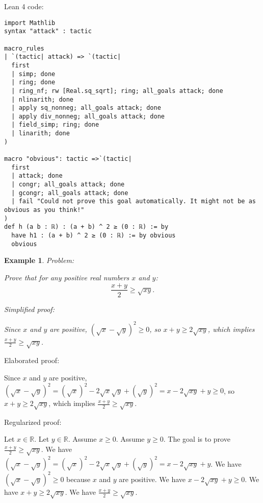 \documentclass{article}
\newtheorem{example}{Example}
\begin{document}
Lean 4 code:
\begin{tcolorbox}[colback=white!10, width=\linewidth]
\begin{lstlisting}[language=Lean4]
import Mathlib
syntax "attack" : tactic

macro_rules
| `(tactic| attack) => `(tactic|
  first
  | simp; done
  | ring; done
  | ring_nf; rw [Real.sq_sqrt]; ring; all_goals attack; done
  | nlinarith; done
  | apply sq_nonneg; all_goals attack; done
  | apply div_nonneg; all_goals attack; done
  | field_simp; ring; done
  | linarith; done
)

macro "obvious": tactic =>`(tactic|
  first
  | attack; done
  | congr; all_goals attack; done
  | gcongr; all_goals attack; done
  | fail "Could not prove this goal automatically. It might not be as obvious as you think!"
)
def h (a b : ℝ) : (a + b) ^ 2 ≥ (0 : ℝ) := by
  have h1 : (a + b) ^ 2 ≥ (0 : ℝ) := by obvious
  obvious

\end{lstlisting}
\end{tcolorbox}


\begin{example}
Problem:
\begin{tcolorbox}[colback=yellow!10, width=\linewidth]
Prove that for any positive real numbers $x$ and $y$:
    $$\frac{x+y}{2} \geq \sqrt{xy}.$$
\end{tcolorbox}

Simplified proof:
\begin{tcolorbox}[colback=blue!10, width=\linewidth]
Since $x$ and $y$ are positive, $(\sqrt x - \sqrt y)^2 \ge 0$, so $x+y \ge 2\sqrt{xy}$, which implies $\frac{x+y}{2} \ge \sqrt{xy}$.
\end{tcolorbox}
\end{example}

Elaborated proof:
\begin{tcolorbox}[colback=green!10, width=\linewidth]
Since $x$ and $y$ are positive, $(\sqrt x - \sqrt y)^2 = (\sqrt{x})^2 - 2\sqrt{x}\sqrt{y} + (\sqrt{y})^2= x - 2\sqrt{xy} + y \ge 0$, so $x+y \ge 2\sqrt{xy}$, which implies $\frac{x+y}{2} \ge \sqrt{xy}$.
\end{tcolorbox}

Regularized proof:
\begin{tcolorbox}[colback=red!10, width=\linewidth]
Let $x\in\mathbb{R}$.
Let $y\in\mathbb{R}$.
Assume $x\ge 0$.
Assume $y\ge 0$.
The goal is to prove $\frac{x+y}{2} \ge \sqrt{xy}$.
We have ${{(\sqrt x - \sqrt y)}}^2 = {{(\sqrt{x})}}^2 - 2\sqrt{x}\sqrt{y} + {{(\sqrt{y})}}^2= x - 2\sqrt{xy} + y$.
We have ${{(\sqrt x - \sqrt y)}}^2 \ge 0$ because $x$ and $y$ are positive.
We have $x - 2\sqrt{xy} + y \ge 0$.
We have $x+y \ge 2\sqrt{xy}$.
We have $\frac{x+y}{2} \ge \sqrt{xy}$.
\end{tcolorbox}
\end{document}
